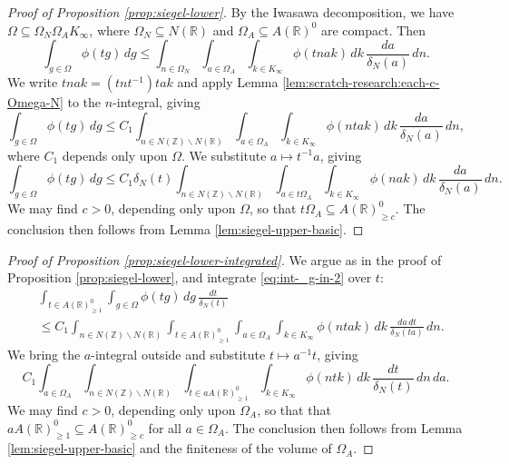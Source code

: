 \begin{proof}[Proof of Proposition \ref{prop:siegel-lower}]
  By the Iwasawa decomposition, we have $\Omega \subseteq \Omega_N \Omega_A K_\infty$, where $\Omega_N \subseteq N(\mathbb{R})$ and $\Omega_A \subseteq A(\mathbb{R})^0$ are compact.  Then
  \begin{equation*}
    \int_{g \in \Omega } \phi(t g) \, d g
    \leq
    \int_{n \in \Omega_N}
    \int_{a \in \Omega_A}
    \int_{k \in K_\infty }
    \phi(t n a k)
    \, d k \, \frac{d a}{\delta_N(a)}  \, d n.
  \end{equation*}
  We write $t n a k = (t n t^{-1}) t a k$ and apply Lemma \ref{lem:scratch-research:each-c-Omega-N} to the $n$-integral, giving
  \begin{equation}\label{eq:int-_g-in-2}
    \int_{g \in \Omega } \phi(t g) \, d g \leq
    C_1 \int_{n \in N(\mathbb{Z}) \backslash N(\mathbb{R})}
    \int_{a \in \Omega_A } \int_{k \in K_\infty } \phi(n t a k)
    \, d k
    \, \frac{d a}{\delta_N(a)}
    \, d n,
  \end{equation}
  where $C_1$ depends only upon $\Omega$.  We substitute $a \mapsto t^{-1} a$, giving
  \begin{equation*}
    \int_{g \in \Omega } \phi(t g) \, d g \leq
    C_1 \delta_N(t) \int_{n \in N(\mathbb{Z}) \backslash N(\mathbb{R})}
    \int_{a \in t \Omega_A } \int_{k \in K_\infty } \phi(n a k)
    \, d k
    \, \frac{d a}{\delta_N(a)}
    \, d n.
  \end{equation*}
  We may find $c > 0$, depending only upon $\Omega$, so that $t \Omega_A \subseteq A(\mathbb{R})_{\geq c}^0$.  The conclusion then follows from Lemma \ref{lem:siegel-upper-basic}.
\end{proof}
\begin{proof}[Proof of Proposition \ref{prop:siegel-lower-integrated}]
  We argue as in the proof of Proposition \ref{prop:siegel-lower}, and integrate \eqref{eq:int-_g-in-2} over $t$:
  \begin{align*}
    &\int_{t \in A(\mathbb{R})^0_{\geq 1}} \int_{g \in \Omega } \phi(t g) \, d g \, \frac{d t}{\delta_N(t)} \\
    &\leq
      C_1 \int_{n \in N(\mathbb{Z}) \backslash N(\mathbb{R})}
      \int_{t \in A(\mathbb{R})^0_{\geq 1}}
      \int_{a \in \Omega_A } \int_{k \in K_\infty } \phi(n t a k)
      \, d k
      \, \frac{d a \, d t}{\delta_N(t a)}
      \, d n.
  \end{align*}
  We bring the $a$-integral outside and substitute $t \mapsto a^{-1} t$, giving
  \begin{equation*}
    C_1
    \int_{a \in \Omega_A }
    \int_{n \in N(\mathbb{Z}) \backslash N(\mathbb{R})}
    \int_{t \in a A(\mathbb{R})^0_{\geq 1}}
    \int_{k \in K_\infty } \phi(n t k)
    \, d k
    \, \frac{d t}{\delta_N(t)}
    \, d n \, d a.
  \end{equation*}
  We may find $c > 0$, depending only upon $\Omega_A$, so that that $a A(\mathbb{R})_{\geq 1}^0 \subseteq A(\mathbb{R})_{\geq c}^0$ for all $a \in \Omega_A$.  The conclusion then follows from Lemma \ref{lem:siegel-upper-basic} and the finiteness of the volume of $\Omega_A$.
\end{proof}



